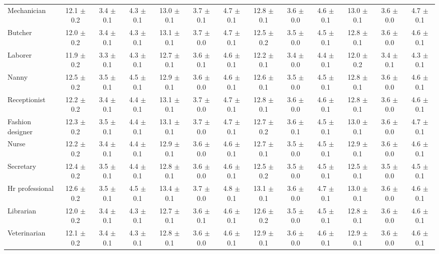 \begin{table*}[p]
{\begin{tabular}{l|ccc|ccc|ccc|ccc}
Mechanician
& 12.1 $\pm$ 0.2 & 3.4 $\pm$ 0.1 & 4.3 $\pm$ 0.1 & 13.0 $\pm$ 0.1 & 3.7 $\pm$ 0.1 & 4.7 $\pm$ 0.1 & 12.8 $\pm$ 0.1 & 3.6 $\pm$ 0.0 & 4.6 $\pm$ 0.1 & 13.0 $\pm$ 0.1 & 3.6 $\pm$ 0.0 & 4.7 $\pm$ 0.1 \\
Butcher
& 12.0 $\pm$ 0.2 & 3.4 $\pm$ 0.1 & 4.3 $\pm$ 0.1 & 13.1 $\pm$ 0.1 & 3.7 $\pm$ 0.0 & 4.7 $\pm$ 0.1 & 12.5 $\pm$ 0.2 & 3.5 $\pm$ 0.0 & 4.5 $\pm$ 0.1 & 12.8 $\pm$ 0.1 & 3.6 $\pm$ 0.0 & 4.6 $\pm$ 0.1 \\
Laborer
& 11.9 $\pm$ 0.2 & 3.3 $\pm$ 0.1 & 4.3 $\pm$ 0.1 & 12.7 $\pm$ 0.1 & 3.6 $\pm$ 0.1 & 4.6 $\pm$ 0.1 & 12.2 $\pm$ 0.1 & 3.4 $\pm$ 0.0 & 4.4 $\pm$ 0.1 & 12.0 $\pm$ 0.2 & 3.4 $\pm$ 0.1 & 4.3 $\pm$ 0.1 \\
Nanny
& 12.5 $\pm$ 0.2 & 3.5 $\pm$ 0.1 & 4.5 $\pm$ 0.1 & 12.9 $\pm$ 0.1 & 3.6 $\pm$ 0.0 & 4.6 $\pm$ 0.1 & 12.6 $\pm$ 0.1 & 3.5 $\pm$ 0.0 & 4.5 $\pm$ 0.1 & 12.8 $\pm$ 0.1 & 3.6 $\pm$ 0.0 & 4.6 $\pm$ 0.1 \\
Receptionist
& 12.2 $\pm$ 0.2 & 3.4 $\pm$ 0.1 & 4.4 $\pm$ 0.1 & 13.1 $\pm$ 0.1 & 3.7 $\pm$ 0.0 & 4.7 $\pm$ 0.1 & 12.8 $\pm$ 0.1 & 3.6 $\pm$ 0.0 & 4.6 $\pm$ 0.1 & 12.8 $\pm$ 0.1 & 3.6 $\pm$ 0.0 & 4.6 $\pm$ 0.1 \\
Fashion designer
& 12.3 $\pm$ 0.2 & 3.5 $\pm$ 0.1 & 4.4 $\pm$ 0.1 & 13.1 $\pm$ 0.1 & 3.7 $\pm$ 0.0 & 4.7 $\pm$ 0.1 & 12.7 $\pm$ 0.2 & 3.6 $\pm$ 0.1 & 4.5 $\pm$ 0.1 & 13.0 $\pm$ 0.1 & 3.6 $\pm$ 0.0 & 4.7 $\pm$ 0.1 \\
Nurse
& 12.2 $\pm$ 0.2 & 3.4 $\pm$ 0.1 & 4.4 $\pm$ 0.1 & 12.9 $\pm$ 0.1 & 3.6 $\pm$ 0.0 & 4.6 $\pm$ 0.1 & 12.7 $\pm$ 0.1 & 3.5 $\pm$ 0.0 & 4.5 $\pm$ 0.1 & 12.9 $\pm$ 0.1 & 3.6 $\pm$ 0.0 & 4.6 $\pm$ 0.1 \\
Secretary
& 12.4 $\pm$ 0.2 & 3.5 $\pm$ 0.1 & 4.4 $\pm$ 0.1 & 12.8 $\pm$ 0.1 & 3.6 $\pm$ 0.0 & 4.6 $\pm$ 0.1 & 12.5 $\pm$ 0.2 & 3.5 $\pm$ 0.0 & 4.5 $\pm$ 0.1 & 12.5 $\pm$ 0.1 & 3.5 $\pm$ 0.0 & 4.5 $\pm$ 0.1 \\
Hr professional
& 12.6 $\pm$ 0.2 & 3.5 $\pm$ 0.1 & 4.5 $\pm$ 0.1 & 13.4 $\pm$ 0.1 & 3.7 $\pm$ 0.0 & 4.8 $\pm$ 0.1 & 13.1 $\pm$ 0.1 & 3.6 $\pm$ 0.0 & 4.7 $\pm$ 0.1 & 13.0 $\pm$ 0.1 & 3.6 $\pm$ 0.0 & 4.6 $\pm$ 0.1 \\
Librarian
& 12.0 $\pm$ 0.2 & 3.4 $\pm$ 0.1 & 4.3 $\pm$ 0.1 & 12.7 $\pm$ 0.1 & 3.6 $\pm$ 0.1 & 4.6 $\pm$ 0.1 & 12.6 $\pm$ 0.2 & 3.5 $\pm$ 0.0 & 4.5 $\pm$ 0.1 & 12.8 $\pm$ 0.1 & 3.6 $\pm$ 0.0 & 4.6 $\pm$ 0.1 \\
Veterinarian
& 12.1 $\pm$ 0.2 & 3.4 $\pm$ 0.1 & 4.3 $\pm$ 0.1 & 12.8 $\pm$ 0.1 & 3.6 $\pm$ 0.0 & 4.6 $\pm$ 0.1 & 12.9 $\pm$ 0.1 & 3.6 $\pm$ 0.0 & 4.6 $\pm$ 0.1 & 12.9 $\pm$ 0.1 & 3.6 $\pm$ 0.0 & 4.6 $\pm$ 0.1 \\

\end{tabular}}
\end{table*}
